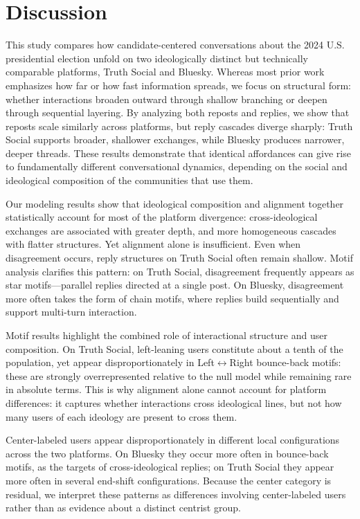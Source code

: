 \documentclass[letterpaper]{article} %
\newcommand{\rev}[1]{{\color{blue}#1}}
\begin{document}
\section{Discussion}
This study compares how candidate-centered conversations about the 2024 U.S. presidential election unfold on two ideologically distinct but technically comparable platforms, Truth Social and Bluesky. Whereas most prior work emphasizes how far or how fast information spreads, we focus on structural form: whether interactions broaden outward through shallow branching or deepen through sequential layering. By analyzing both reposts and replies, we show that reposts scale similarly across platforms, but reply cascades diverge sharply: Truth Social supports broader, shallower exchanges, while Bluesky produces narrower, deeper threads. These results demonstrate that identical affordances can give rise to fundamentally different conversational dynamics, depending on the social and ideological composition of the communities that use them.

Our modeling results show that ideological composition and alignment together \rev{statistically account for} most of the platform divergence: \rev{cross-ideological exchanges are associated with greater depth, and more homogeneous cascades with flatter structures}. Yet alignment alone is insufficient. Even when disagreement occurs, reply structures on Truth Social often remain shallow. 
Motif analysis clarifies this pattern: on Truth Social, disagreement frequently appears as star motifs---parallel replies directed at a single post. On Bluesky, disagreement more often takes the form of chain motifs, where replies build sequentially and support multi-turn interaction.

Motif results highlight the combined role of interactional structure and user composition. On Truth Social, left-leaning users constitute \rev{about a tenth} of the population, yet appear disproportionately in Left$\leftrightarrow$Right bounce-back motifs: these are strongly overrepresented relative to the null model while remaining rare in absolute terms. \rev{This is why alignment alone cannot account for platform differences: it captures whether interactions cross ideological lines, but not how many users of each ideology are present to cross them.}

\rev{Center-labeled users appear disproportionately in different local configurations across the two platforms. On Bluesky they occur more often in bounce-back motifs, as the targets of cross-ideological replies; on Truth Social they appear more often in several end-shift configurations. Because the center category is residual, we interpret these patterns as differences involving center-labeled users rather than as evidence about a distinct centrist group.}
\end{document}
